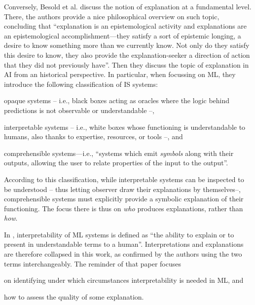 \documentclass[12pt,a4paper,openright,twoside]{book}
\begin{document}
Conversely, Besold et al. \cite{BesoldU2018} discuss the notion of explanation at a fundamental level.
%
There, the authors provide a nice philosophical overview on such topic, concluding that ``explanation is an epistemological activity and explanations are an epistemological accomplishment---they satisfy a sort of epistemic longing, a desire to know something more than we currently know. Not only do they satisfy this desire to know, they also provide the explanation-seeker a direction of action that they did not previously have''.
%
Then they discuss the topic of explanation in AI from an historical perspective.
%
In particular, when focussing on ML, they introduce the following classification of IS systems:
%
\begin{enumerate*}[label=\emph{(\roman{*})}]
	\item opaque systems -- i.e., black boxes acting as oracles where the logic behind predictions is not observable or understandable --,
	
	\item interpretable systems -- i.e., white boxes whose functioning is understandable to humans, also thanks to expertise, resources, or tools --, and
	
	\item comprehensible systems---i.e., ``systems which emit \emph{symbols} along with their outputs, allowing the user to relate properties of the input to the output''.
\end{enumerate*}
%
According to this classification, while interpretable systems can be inspected to be understood -- thus letting observer draw their explanations by themselves--, comprehensible systems must explicitly provide a symbolic explanation of their functioning.
%
The focus there is thus on \emph{who} produces explanations, rather than \emph{how}.

In \cite{DoshiVelezK2017}, interpretability of ML systems is defined as ``the ability to explain or to present in understandable terms to a human''.
%
Interpretations and explanations are therefore collapsed in this work, as confirmed by the authors using the two terms interchangeably.
%
The reminder of that paper focuses 
\begin{enumerate*}[label=\emph{(\roman{*})}]
	\item on identifying under which circumstances interpretability is needed in ML, and
	\item how to assess the quality of some explanation.
\end{enumerate*}
\end{document}
